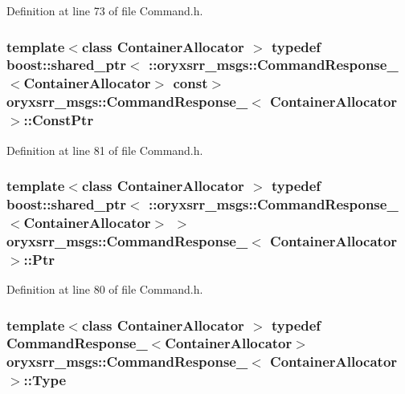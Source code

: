 \-Definition at line 73 of file \-Command.\-h.

\subsubsection[{\-Const\-Ptr}]{\setlength{\rightskip}{0pt plus 5cm}template$<$class Container\-Allocator $>$ typedef boost\-::shared\-\_\-ptr$<$ \-::{\bf oryxsrr\-\_\-msgs\-::\-Command\-Response\-\_\-}$<$\-Container\-Allocator$>$ const$>$ {\bf oryxsrr\-\_\-msgs\-::\-Command\-Response\-\_\-}$<$ \-Container\-Allocator $>$\-::{\bf \-Const\-Ptr}}\label{structoryxsrr__msgs_1_1CommandResponse___abd5492a0d75d1a5bd6553abf1b5b7567}


\-Definition at line 81 of file \-Command.\-h.

\subsubsection[{\-Ptr}]{\setlength{\rightskip}{0pt plus 5cm}template$<$class Container\-Allocator $>$ typedef boost\-::shared\-\_\-ptr$<$ \-::{\bf oryxsrr\-\_\-msgs\-::\-Command\-Response\-\_\-}$<$\-Container\-Allocator$>$ $>$ {\bf oryxsrr\-\_\-msgs\-::\-Command\-Response\-\_\-}$<$ \-Container\-Allocator $>$\-::{\bf \-Ptr}}\label{structoryxsrr__msgs_1_1CommandResponse___a839bc304461ce5b12281094e8f181086}


\-Definition at line 80 of file \-Command.\-h.

\subsubsection[{\-Type}]{\setlength{\rightskip}{0pt plus 5cm}template$<$class Container\-Allocator $>$ typedef {\bf \-Command\-Response\-\_\-}$<$\-Container\-Allocator$>$ {\bf oryxsrr\-\_\-msgs\-::\-Command\-Response\-\_\-}$<$ \-Container\-Allocator $>$\-::{\bf \-Type}}\label{structoryxsrr__msgs_1_1CommandResponse___a8bc7fe5813565456ecff6dd7e8f96e8b}


